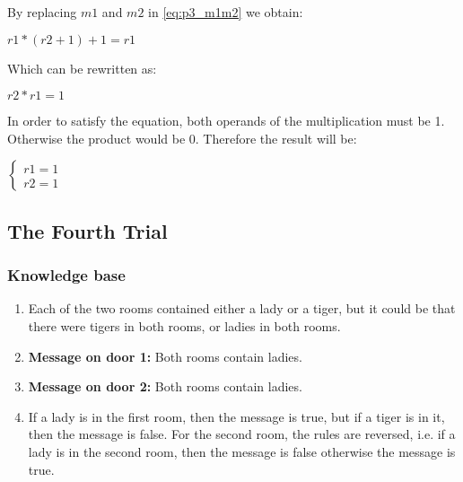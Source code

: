 By replacing $m1$ and $m2$ in \ref{eq:p3_m1m2} we obtain:

\begin{center}
\begin{math}
 r1 * (r2 + 1) + 1 = r1
\end{math} 
\end{center}

Which can be rewritten as: 

\begin{center}
\begin{math}
 r2 * r1 = 1
\end{math} 
\end{center}


In order to satisfy the equation, both operands of the multiplication must be 1. Otherwise the product would be 0. Therefore the result will be:

\begin{center}
\begin{math}
\begin{cases}
 r1 = 1\\
 r2 = 1
\end{cases}
\end{math} 
\end{center}








\subsection{The Fourth Trial}

\subsubsection{Knowledge base}

\begin{enumerate}

\item Each of the two rooms contained either a lady or a tiger, but it could be that there were tigers in both rooms, or ladies in both rooms.

\item \textbf{Message on door 1:} Both rooms contain ladies.

\item \textbf{Message on door 2:} Both rooms contain ladies.


\item If a lady is in the first room, then the message is true, but if a tiger is in it, then the message is false. For the second room, the rules are reversed, i.e. if a lady is in the second room, then the message is false otherwise the message is true.

\end{enumerate}


